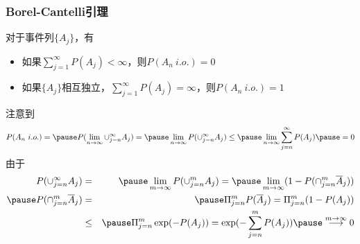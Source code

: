 \documentclass[Prob-All.tex]{subfiles}
\begin{document}
\begin{frame}
  \frametitle{Borel-Cantelli引理}
  \begin{thm}
    对于事件列$\{A_j\}$，有
    \begin{itemize}[<+-|alert@+>]
    \item 如果$\sum_{j=1}^\infty P(A_j)<\infty$，则$P(A_n\ i.o.)=0$
    \item 如果$\{A_j\}$相互独立，$\sum_{j=1}^\infty P(A_j)=\infty$，则$P(A_n\ i.o.)=1$
    \end{itemize}
  \end{thm}\pause
  \zheng 注意到
  \begin{eqnarray*}
    P(A_n\ i.o.)=\pause P(\lim_{n\rightarrow\infty} \cup_{j=n}^\infty A_j)=\pause \lim_{n\rightarrow\infty} P(\cup_{j=n}^\infty A_j)\le \pause \lim_{n\rightarrow\infty}\sum_{j=n}^\infty P(A_j)\pause =0
  \end{eqnarray*}
  \pause
  由于\pause
  \begin{eqnarray*}
    P(\cup_{j=n}^\infty A_j)&=&\pause \lim_{m\rightarrow\infty}P(\cup_{j=n}^m A_j)=\pause \lim_{m\rightarrow\infty}(1-P(\cap_{j=n}^m\overline{A}_j))\\\pause
    P(\cap_{j=n}^m\overline{A}_j)&=&\pause \Pi_{j=n}^m P(\overline{A}_j)=\Pi_{j=n}^m(1-P(A_j))\\
                            &\le&\pause \Pi_{j=n}^m \exp(-P(A_j))=\exp(-\sum_{j=n}^m P(A_j))\pause \stackrel{m\rightarrow\infty}{\longrightarrow} 0
  \end{eqnarray*}

\end{frame}
\end{document}
